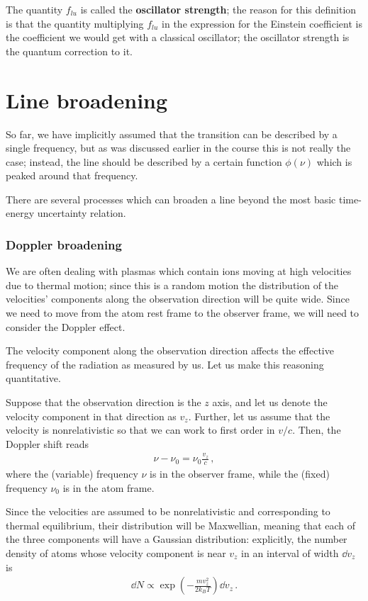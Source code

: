 \documentclass[main.tex]{subfiles}
\begin{document}
The quantity \(f_{lu}\) is called the \textbf{oscillator strength}; the reason for this definition is that the quantity multiplying \(f_{lu}\) in the expression for the Einstein coefficient is the coefficient we would get with a classical oscillator; the oscillator strength is the quantum correction to it.

\section{Line broadening}

So far, we have implicitly assumed that the transition can be described by a single frequency, but as was discussed earlier in the course this is not really the case; instead, the line should be described by a certain function \(\phi (\nu )\) which is peaked around that frequency. 

There are several processes which can broaden a line beyond the most basic time-energy uncertainty relation. 

\subsubsection{Doppler broadening}

We are often dealing with plasmas which contain ions moving at high velocities due to thermal motion; since this is a random motion the distribution of the velocities' components along the observation direction will be quite wide. 
Since we need to move from the atom rest frame to the observer frame, we will need to consider the Doppler effect.

The velocity component along the observation direction affects the effective frequency of the radiation as measured by us. 
Let us make this reasoning quantitative. 

Suppose that the observation direction is the \(z\) axis, and let us denote the velocity component in that direction as \(v_z\). 
Further, let us assume that the velocity is nonrelativistic so that we can work to first order in \(v/c\). Then, the Doppler shift reads 
%
\begin{align}
\nu - \nu_0  = \nu_0 \frac{v_z}{c} 
\,,
\end{align}
%
where the (variable) frequency \(\nu \) is in the observer frame, while the (fixed) frequency \(\nu_0 \) is in the atom frame. 

Since the velocities are assumed to be nonrelativistic and corresponding to thermal equilibrium, their distribution will be Maxwellian, meaning that each of the three components will have a Gaussian distribution: explicitly, the number density of atoms whose velocity component is near \(v_z\) in an interval of width \(\dd{v_z}\) is 
%
\begin{align}
\dd{N} \propto \exp(- \frac{m v_z^2}{2 k_B T}) \dd{v_z}
\,.
\end{align}
\end{document}
